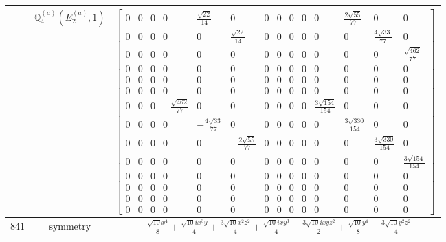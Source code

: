 \documentclass[fleqn,8pt,landscape]{jsarticle}
\begin{document}
\begin{longtable}{ccc}
$  $ & $ \mathbb{Q}_{4}^{(a)}(E_{2}^{(a)},1) $ & $ \begin{bmatrix} 0 & 0 & 0 & 0 & \frac{\sqrt{22}}{14} & 0 & 0 & 0 & 0 & 0 & 0 & \frac{2 \sqrt{55}}{77} & 0 & 0 \\ 0 & 0 & 0 & 0 & 0 & \frac{\sqrt{22}}{14} & 0 & 0 & 0 & 0 & 0 & 0 & \frac{4 \sqrt{33}}{77} & 0 \\ 0 & 0 & 0 & 0 & 0 & 0 & 0 & 0 & 0 & 0 & 0 & 0 & 0 & \frac{\sqrt{462}}{77} \\ 0 & 0 & 0 & 0 & 0 & 0 & 0 & 0 & 0 & 0 & 0 & 0 & 0 & 0 \\ 0 & 0 & 0 & 0 & 0 & 0 & 0 & 0 & 0 & 0 & 0 & 0 & 0 & 0 \\ 0 & 0 & 0 & 0 & 0 & 0 & 0 & 0 & 0 & 0 & 0 & 0 & 0 & 0 \\ 0 & 0 & 0 & - \frac{\sqrt{462}}{77} & 0 & 0 & 0 & 0 & 0 & 0 & \frac{3 \sqrt{154}}{154} & 0 & 0 & 0 \\ 0 & 0 & 0 & 0 & - \frac{4 \sqrt{33}}{77} & 0 & 0 & 0 & 0 & 0 & 0 & \frac{3 \sqrt{330}}{154} & 0 & 0 \\ 0 & 0 & 0 & 0 & 0 & - \frac{2 \sqrt{55}}{77} & 0 & 0 & 0 & 0 & 0 & 0 & \frac{3 \sqrt{330}}{154} & 0 \\ 0 & 0 & 0 & 0 & 0 & 0 & 0 & 0 & 0 & 0 & 0 & 0 & 0 & \frac{3 \sqrt{154}}{154} \\ 0 & 0 & 0 & 0 & 0 & 0 & 0 & 0 & 0 & 0 & 0 & 0 & 0 & 0 \\ 0 & 0 & 0 & 0 & 0 & 0 & 0 & 0 & 0 & 0 & 0 & 0 & 0 & 0 \\ 0 & 0 & 0 & 0 & 0 & 0 & 0 & 0 & 0 & 0 & 0 & 0 & 0 & 0 \\ 0 & 0 & 0 & 0 & 0 & 0 & 0 & 0 & 0 & 0 & 0 & 0 & 0 & 0 \end{bmatrix} $ \\ \hline
$ 841 $ & $ \text{symmetry} $ & $ - \frac{\sqrt{10} x^{4}}{8} + \frac{\sqrt{10} i x^{3} y}{4} + \frac{3 \sqrt{10} x^{2} z^{2}}{4} + \frac{\sqrt{10} i x y^{3}}{4} - \frac{3 \sqrt{10} i x y z^{2}}{2} + \frac{\sqrt{10} y^{4}}{8} - \frac{3 \sqrt{10} y^{2} z^{2}}{4} $ \\

\end{longtable}
\end{document}
